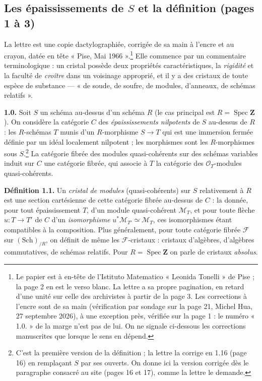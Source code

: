 \documentclass[11pt,a4paper]{article}
\begin{document}
\subsection*{Les épaississements de $S$ et la définition (pages 1 à 3)}

La lettre est une copie dactylographiée, corrigée de sa main à l'encre et au
crayon, datée en tête « Pise, Mai 1966 ».\footnote{Le papier est à en-tête de
l'Istituto Matematico « Leonida Tonelli » de Pise ; la page 2 en est le verso
blanc. La lettre a sa propre pagination, en retard d'une unité sur celle des
archivistes à partir de la page 3. Les corrections à l'encre sont de sa main
(vérification par sondage sur la page 21, Michel Hua, 27 septembre 2026), à une
exception près, vérifiée sur la page 1 : le numéro « 1.0. » de la marge n'est
pas de lui. On ne signale ci-dessous les corrections manuscrites que lorsque le
sens en dépend.} Elle commence par un commentaire terminologique : un cristal
possède deux propriétés caractéristiques, la \emph{rigidité} et la faculté de
\emph{croître} dans un voisinage approprié, et il y a des cristaux de toute
espèce de substance — « de soude, de soufre, de modules, d'anneaux, de schémas
relatifs ».

\textbf{1.0.} Soit $S$ un schéma au-dessus d'un schéma $R$ (le cas principal
est $R = \operatorname{Spec}\mathbf{Z}$). On considère la catégorie $C$ des
\emph{épaississements nilpotents} de $S$ au-dessus de $R$ : les $R$-schémas
$T$ munis d'un $R$-morphisme $S \to T$ qui est une immersion fermée définie par
un idéal localement nilpotent ; les morphismes sont les $R$-morphismes sous
$S$.\footnote{C'est la première version de la définition ; la lettre la
corrige en 1.16 (page 16) en remplaçant $S$ par ses ouverts. On donne ici la
version corrigée dès le paragraphe consacré au site (pages 16 et 17), comme la
lettre le demande.} La catégorie fibrée des modules quasi-cohérents sur des
schémas variables induit sur $C$ une catégorie fibrée, qui associe à $T$ la
catégorie des $\mathcal{O}_T$-modules quasi-cohérents.

\textbf{Définition 1.1.} Un \emph{cristal de modules} (quasi-cohérents) sur
$S$ relativement à $R$ est une section cartésienne de cette catégorie fibrée
au-dessus de $C$ : la donnée, pour tout épaississement $T$, d'un module
quasi-cohérent $\mathcal{M}_T$, et pour toute flèche $u : T \to T'$ de $C$ d'un
\emph{isomorphisme} $u^*\mathcal{M}_{T'} \simeq \mathcal{M}_T$, ces isomorphismes
étant compatibles à la composition. Plus généralement, pour toute catégorie
fibrée $\mathcal{F}$ sur $(\mathrm{Sch})_{/R}$, on définit de même les
$\mathcal{F}$-cristaux : cristaux d'algèbres, d'algèbres commutatives, de
schémas relatifs. Pour $R = \operatorname{Spec}\mathbf{Z}$ on parle de
cristaux \emph{absolus}.
\end{document}
